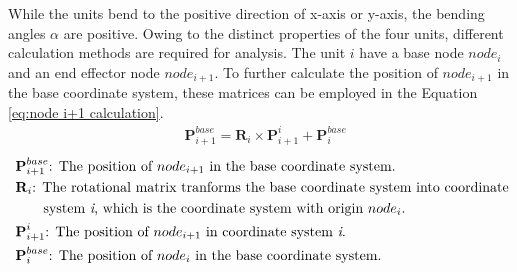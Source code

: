 \noindent While the units bend to the positive direction of x-axis or y-axis, the bending angles $\alpha$ are positive. 
Owing to the distinct properties of the four units, different calculation methods are required for analysis. The unit $i$ 
have a base node $node_i$ and an end effector node $node_{i+1}$. To further calculate the position of $node_{i+1}$ in the 
base coordinate system, these matrices can be employed in the Equation \ref{eq:node i+1 calculation}.
\begin{align}
    &\textbf{P}_{i+1}^{base} = \textbf{R}_{i} \times \textbf{P}_{i+1}^{i} + \textbf{P}_{i}^{base}
    \label{eq:node i+1 calculation}
\end{align}
\begin{align*}
    &\ \textbf{P}_{i+1}^{base}\text{: The position of $node_{i+1}$ in the base coordinate system.}\\
    &\ \textbf{R}_{i}\text{: The rotational matrix tranforms the base coordinate system into coordinate}\\
    &\ \qquad\text{system \textit{i}, which is the coordinate system with origin $node_i$.}\\
    &\ \textbf{P}_{i+1}^{i}\text{: The position of $node_{i+1}$ in coordinate system \textit{i}.}\\
    &\ \textbf{P}_{i}^{base}\text{: The position of $node_{i}$ in the base coordinate system.}
\end{align*}
